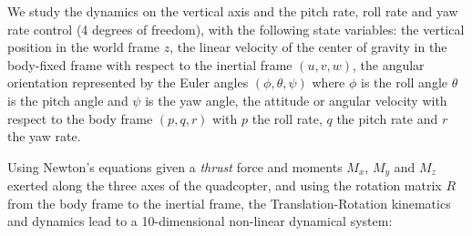 \documentclass[anonymous=true,format=sigconf, screen=true, review=false]{acmart}
\begin{document}
We study the dynamics on the vertical axis and the pitch rate, roll rate and yaw rate control (4 degrees of freedom), with the following state variables: 
the vertical position in the world frame $z$,
the linear velocity of the center of gravity  
in the body-fixed frame with respect 
to the inertial frame $(u, v, w)$,
the angular orientation represented by the Euler angles $(\phi, \theta, \psi)$ where $\phi$ is the roll angle 
$\theta$ is the pitch angle and $\psi$ is the yaw angle, %
the attitude or angular velocity with respect to the body frame $(p, q, r)$ with $p$ the roll rate, $q$ the pitch rate and $r$ the yaw rate.

Using Newton's equations given a \emph{thrust} force and moments $M_x$, $M_y$ and $M_z$ exerted along the three axes of the quadcopter, 
and using the rotation matrix $R$ from the body frame to the inertial frame, 
the Translation-Rotation kinematics and dynamics \cite{quadcopter_model} lead to a 10-dimensional non-linear dynamical system: 
\end{document}

